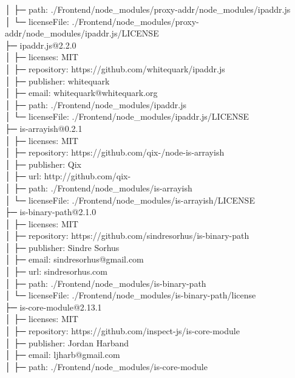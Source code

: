 \documentclass[
    paper=a4,
    twoside=false,
    parskip=half,
    listof=entryprefix,
    listof=totoc,
    index=totoc,
    bibliography=totoc,
    headsepline,
]{scrbook}
\begin{document}
    │  ├─ path: ./Frontend/node\_modules/proxy-addr/node\_modules/ipaddr.js\\
    │  └─ licenseFile: ./Frontend/node\_modules/proxy-addr/node\_modules/ipaddr.js/LICENSE\\
    ├─ ipaddr.js@2.2.0\\
    │  ├─ licenses: MIT\\
    │  ├─ repository: https://github.com/whitequark/ipaddr.js\\
    │  ├─ publisher: whitequark\\
    │  ├─ email: whitequark@whitequark.org\\
    │  ├─ path: ./Frontend/node\_modules/ipaddr.js\\
    │  └─ licenseFile: ./Frontend/node\_modules/ipaddr.js/LICENSE\\
    ├─ is-arrayish@0.2.1\\
    │  ├─ licenses: MIT\\
    │  ├─ repository: https://github.com/qix-/node-is-arrayish\\
    │  ├─ publisher: Qix\\
    │  ├─ url: http://github.com/qix-\\
    │  ├─ path: ./Frontend/node\_modules/is-arrayish\\
    │  └─ licenseFile: ./Frontend/node\_modules/is-arrayish/LICENSE\\
    ├─ is-binary-path@2.1.0\\
    │  ├─ licenses: MIT\\
    │  ├─ repository: https://github.com/sindresorhus/is-binary-path\\
    │  ├─ publisher: Sindre Sorhus\\
    │  ├─ email: sindresorhus@gmail.com\\
    │  ├─ url: sindresorhus.com\\
    │  ├─ path: ./Frontend/node\_modules/is-binary-path\\
    │  └─ licenseFile: ./Frontend/node\_modules/is-binary-path/license\\
    ├─ is-core-module@2.13.1\\
    │  ├─ licenses: MIT\\
    │  ├─ repository: https://github.com/inspect-js/is-core-module\\
    │  ├─ publisher: Jordan Harband\\
    │  ├─ email: ljharb@gmail.com\\
    │  ├─ path: ./Frontend/node\_modules/is-core-module\\
\end{document}
